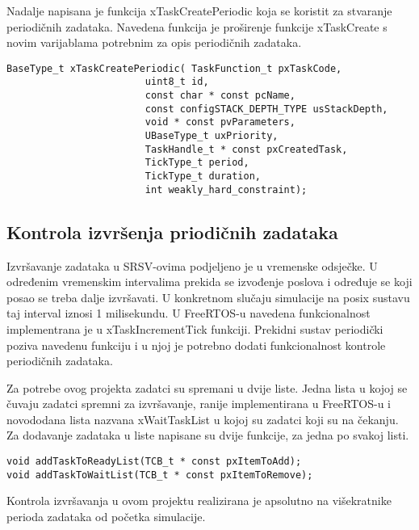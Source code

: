 \documentclass[../zavrsni.tex]{subfiles}
\begin{document}
Nadalje napisana je funkcija xTaskCreatePeriodic koja se koristit za stvaranje periodičnih zadataka.
Navedena funkcija je proširenje funkcije xTaskCreate s novim varijablama potrebnim za opis periodičnih zadataka.

\begin{lstlisting}[style=CStyle,caption={Prototip funkcije xTaskCreatePeriodic},captionpos=b]
BaseType_t xTaskCreatePeriodic( TaskFunction_t pxTaskCode,
                        uint8_t id,
                        const char * const pcName, 
                        const configSTACK_DEPTH_TYPE usStackDepth,
                        void * const pvParameters,
                        UBaseType_t uxPriority,
                        TaskHandle_t * const pxCreatedTask,
                        TickType_t period,
                        TickType_t duration,
                        int weakly_hard_constraint);
\end{lstlisting} 

\subsection{Kontrola izvršenja priodičnih zadataka}

Izvršavanje zadataka u SRSV-ovima podjeljeno je u vremenske odsječke. U određenim vremenskim intervalima prekida se izvođenje poslova i 
određuje se koji posao se treba dalje izvršavati. U konkretnom slučaju simulacije na posix sustavu taj interval iznosi 1 milisekundu.
U FreeRTOS-u navedena funkcionalnost implementrana je u xTaskIncrementTick funkciji. Prekidni sustav periodički poziva navedenu funkciju 
i u njoj je potrebno dodati funkcionalnost kontrole periodičnih zadataka.

Za potrebe ovog projekta zadatci su spremani u dvije liste. Jedna lista u kojoj se čuvaju zadatci spremni za izvršavanje, ranije 
implementirana u FreeRTOS-u i novododana lista nazvana xWaitTaskList u kojoj su zadatci koji su na čekanju. Za dodavanje zadataka u liste
napisane su dvije funkcije, za jedna po svakoj listi.

\begin{lstlisting}[style=CStyle,caption={Definicije funkcija za dodavanje zadataka u opisane liste},captionpos=b]
void addTaskToReadyList(TCB_t * const pxItemToAdd);
void addTaskToWaitList(TCB_t * const pxItemToRemove);
\end{lstlisting}

Kontrola izvršavanja u ovom projektu realizirana je apsolutno na višekratnike perioda zadataka od početka simulacije.
\end{document}
